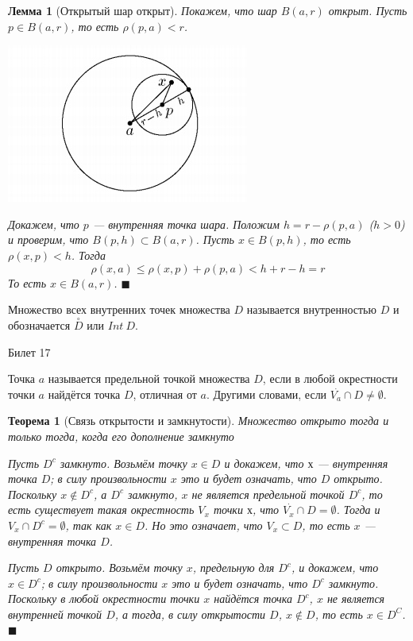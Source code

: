 \documentclass[12pt,a4paper]{article}
\newtheorem*{theorem*}{Теорема}
\newtheorem*{lemma*}{Лемма}
\begin{document}
\begin{lemma*}[Открытый шар открыт]
\label{16.2}
Покажем, что шар $B(a, r)$ открыт. Пусть $p \in B(a, r)$, то есть $\rho(p, a) < r$.
\begin{center}
\includegraphics[scale=0.7]{openCircle.jpg}
\end{center}
Докажем, что $p$ --- внутренняя точка шара. Положим $h = r - \rho(p, a)$ ($h > 0$) и проверим, что $B(p, h) \subset B(a, r)$. Пусть $x \in B(p, h)$, то есть $\rho(x, p) < h$. Тогда
$$
\rho(x, a) \leq \rho(x, p) + \rho(p, a) < h + r - h = r
$$
То есть $x \in B(a, r)$. $\blacksquare$
\end{lemma*}

Множество всех внутренних точек множества $D$ называется внутренностью $D$ и обозначается $\stackrel{\circ}{D}$ или $Int\ D$.

\begin{center}
Билет 17
\end{center}

Точка $a$ называется предельной точкой множества $D$, если в любой окрестности точки $a$ найдётся точка $D$, отличная от $a$. Другими словами, если $\stackrel{.}{V_a} \cap D \ne \emptyset$.

\begin{theorem*}[Связь открытости и замкнутости]
\label{17.1}
Множество открыто тогда и только тогда, когда его дополнение замкнуто

Пусть $D^c$ замкнуто. Возьмём точку $x \in D$ и докажем, что $х$ --- внутренняя точка $D$; в силу произвольности $x$ это и будет означать, что $D$ открыто. Поскольку $x \not\in D^c$, а $D^c$ замкнуто, $x$ не является предельной точкой $D^c$, то есть существует такая окрестность $V_x$ точки $х$, что $\stackrel{\cdot}{V_x} \cap D = \emptyset$. Тогда и $V_x \cap D^c = \emptyset$, так как $x \in D$. Но это означает, что $V_x \subset D$, то есть $x$ --- внутренняя точка $D$.

Пусть $D$ открыто. Возьмём точку $x$, предельную для $D^c$, и докажем, что $x \in D^c$; в силу произвольности $x$ это и будет означать, что $D^c$ замкнуто. Поскольку в любой окрестности точки $x$ найдётся точка $D^c$, $x$ не является внутренней точкой $D$, а тогда, в силу открытости $D$, $x \not\in D$, то есть $x \in D^C$. $\blacksquare$
\end{theorem*}
\end{document}
